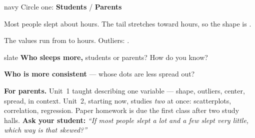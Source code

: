 \documentclass[12pt]{article}
\begin{document}
\vspace{0.08in}
\boxguard
\begin{scenariobox}{navy}
Circle one: \quad \textbf{Students} \quad / \quad \textbf{Parents}\par\vspace{10pt}
Most people slept about \blank{1.6cm} hours. The tail stretches toward \blank{1.8cm} hours,
so the shape is \blank{3.2cm}.\par\vspace{10pt}
The values run from \blank{1.4cm} to \blank{1.4cm} hours. Outliers: \blank{3.4cm}.
\end{scenariobox}

\vspace{0.08in}
\boxguard
\begin{scenariobox}{slate}
\textbf{Who sleeps more,} students or parents? \blank{2.6cm} How do you know?\par\vspace{4pt}
\writeline\par\vspace{8pt}
\textbf{Who is more consistent} --- whose dots are less spread out? \blank{2.6cm}\par\vspace{4pt}
\writeline
\end{scenariobox}

\vspace{0.08in}
\begin{remindbox}
\textbf{For parents.} Unit~1 taught describing one variable --- shape, outliers, center,
spread, in context. Unit~2, starting now, studies \emph{two} at once: scatterplots,
correlation, regression. Paper homework is due the first class after two study halls. \textbf{Ask
your student:} \emph{``If most people slept a lot and a few slept very little, which way is
that skewed?''}
\end{remindbox}
\end{document}
